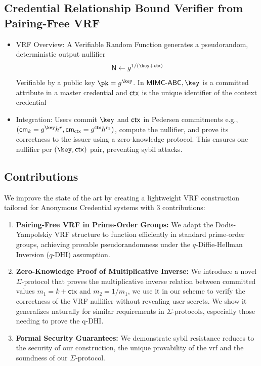 \subsection{Credential Relationship Bound Verifier from Pairing-Free VRF}
\begin{itemize}
    \item VRF Overview: A Verifiable Random Function generates a pseudorandom, deterministic output nullifier 
    \[
    \nul \gets g^{1/(\key + \ctx)}
    \]
    Verifiable by a public key $\pk = g^{\key}$. In $\MIMCABC, \key$ is a committed attribute in a master credential and $\mathsf{ctx}$ is the unique identifier of the context credential

    \item Integration: Users commit $\key$ and $\mathsf{ctx}$ in Pedersen commitments e.g., $( \cm_k = g^{\key} h^r, \cm_{\ctx} = g^{\ctx} h^{r_2})$, compute the nullifier, and prove its correctness to the issuer using a zero-knowledge protocol. This ensures one nullifier per $(\key, \ctx)$ pair, preventing sybil attacks.
\end{itemize}

\subsection{Contributions}

\noindent We improve the state of the art by creating a lightweight VRF construction tailored for Anonymous Credential systems with 3 contributions:
\begin{enumerate}
        \item \textbf{Pairing-Free VRF in Prime-Order Groups:} We adapt the Dodis-Yampolskiy VRF structure to function efficiently in standard prime-order groups, achieving provable pseudorandomness under the $q$-Diffie-Hellman Inversion ($q$-DHI) assumption.

        \item \textbf{Zero-Knowledge Proof of Multiplicative Inverse:} We introduce a novel $\Sigma$-protocol that proves the multiplicative inverse relation between committed values $m_1 = k + \textsf{ctx}$ and $m_2 = 1/m_1$, we use it in our scheme to verify the correctness of the VRF nullifier without revealing user secrets. We show it generalizes naturally for similar requirements in $\Sigma$-protocols, especially those needing to prove the q-DHI.

         \item \textbf{Formal Security Guarantees:} We demonstrate sybil resistance reduces to the security of our construction, the unique provability of the vrf and the soundness of our $\Sigma$-protocol.
\end{enumerate}

